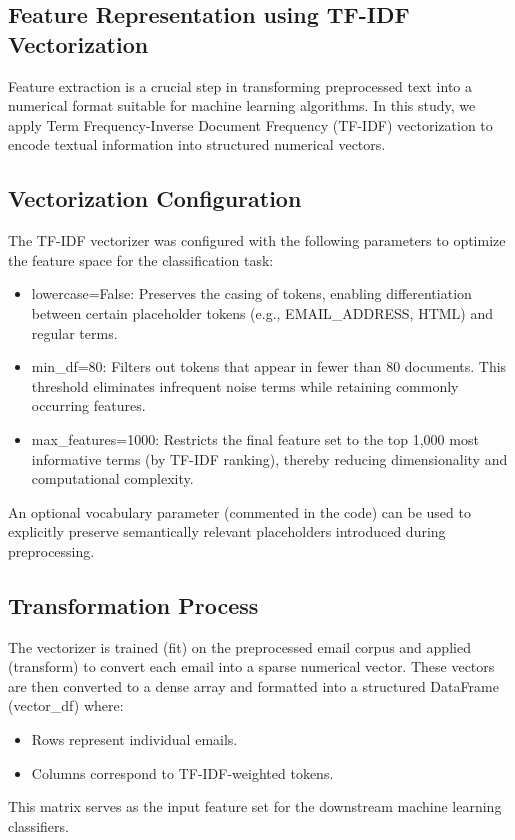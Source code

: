 \subsection{Feature Representation using TF-IDF Vectorization}
\label{subsec:feature-representation-using-tf-idf-vectorization}
Feature extraction is a crucial step in transforming preprocessed text into a numerical format suitable for machine learning algorithms.
In this study, we apply Term Frequency-Inverse Document Frequency (TF-IDF) vectorization to encode textual information into structured numerical vectors.

\subsection{Vectorization Configuration}
\label{subsec:vectorization-configuration}
The TF-IDF vectorizer was configured with the following parameters to optimize the feature space for the classification task:

\begin{itemize}
    \item lowercase=False: Preserves the casing of tokens, enabling differentiation between certain placeholder tokens (e.g., EMAIL\_ADDRESS, HTML) and regular terms.
    \item min\_df=80: Filters out tokens that appear in fewer than 80 documents.
    This threshold eliminates infrequent noise terms while retaining commonly occurring features.
    \item max\_features=1000: Restricts the final feature set to the top 1,000 most informative terms (by TF-IDF ranking), thereby reducing dimensionality and computational complexity.
\end{itemize}

An optional vocabulary parameter (commented in the code) can be used to explicitly preserve semantically relevant placeholders introduced during preprocessing.

\subsection*{Transformation Process}
The vectorizer is trained (fit) on the preprocessed email corpus and applied (transform) to convert each email into a sparse numerical vector.
These vectors are then converted to a dense array and formatted into a structured DataFrame (vector\_df) where:

\begin{itemize}
    \item Rows represent individual emails.
    \item Columns correspond to TF-IDF-weighted tokens.
\end{itemize}

This matrix serves as the input feature set for the downstream machine learning classifiers.